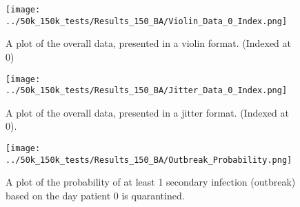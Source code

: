 \documentclass{article}
\numberwithin{equation}{section} %
\begin{document}
\begin{figure}[H]
  \centering
  \texttt{[image: ../50k\_150k\_tests/Results\_150\_BA/Violin\_Data\_0\_Index.png]}
  \caption{A plot of the overall data, presented in a violin format. (Indexed at 0)}
\end{figure}

\begin{figure}[H]
  \centering
  \texttt{[image: ../50k\_150k\_tests/Results\_150\_BA/Jitter\_Data\_0\_Index.png]}
  \caption{A plot of the overall data, presented in a jitter format. (Indexed at 0).}
\end{figure}

\begin{figure}[H]
  \centering
  \texttt{[image: ../50k\_150k\_tests/Results\_150\_BA/Outbreak\_Probability.png]}
  \caption{A plot of the probability of at least 1 secondary infection (outbreak) based on the day patient 0 is quarantined.}
\end{figure}

\newpage
\end{document}
